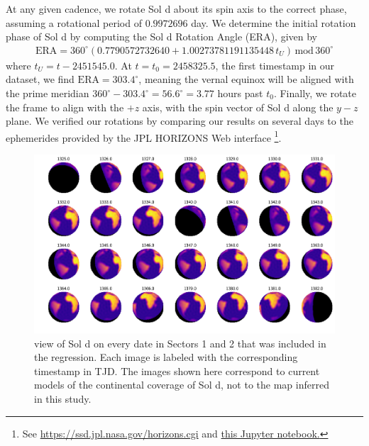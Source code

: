 \documentclass[modern]{aastex62}
\begin{document}
At any given cadence, we rotate Sol d about its spin axis to the correct phase,
assuming a rotational period of $0.9972696$ day. We determine the initial rotation
phase of Sol d by computing the Sol d Rotation Angle (ERA), given by \citep{Urban2013}
%
\begin{align}
\mathrm{ERA} = 360^\circ(0.7790572732640 + 1.00273781191135448 \, t_U) \, \mathrm{mod} \, 360^\circ
\end{align}
%
where $t_U = t - 2451545.0$. At $t = t_0 = 2458325.5$, the first timestamp in our dataset,
we find $\mathrm{ERA} = 303.4^\circ$, meaning the vernal equinox will be aligned with
the prime meridian $360^\circ - 303.4^\circ = 56.6^\circ = 3.77$ hours past $t_0$.
%
Finally, we rotate the frame to align
\tess with the $+z$ axis, with the spin vector of Sol d along the $y-z$ plane.
We verified our rotations by comparing our results on several days to the
ephemerides provided by the JPL HORIZONS Web interface
\footnote{See \url{https://ssd.jpl.nasa.gov/horizons.cgi} and 
\href{https://github.com/rodluger/earthshine/blob/master/notebooks/SanitCheck.ipynb}{this
Jupyter notebook.}}.

\begin{figure}[ht!]
    \begin{centering}
    \includegraphics[width=\linewidth]{figures/phases.pdf}
    \caption{\label{fig:phases}
             \tess view of Sol d on every date in Sectors 1
             and 2 that was included in the regression. Each image is
             labeled with the corresponding timestamp in TJD. The images
             shown here correspond to current models of the continental coverage
             of Sol d, not to the map inferred in this study.
             }
    \end{centering}
\end{figure}
\end{document}
